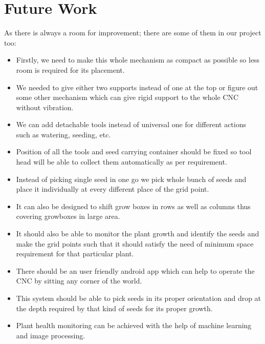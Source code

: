 \documentclass[a4paper,12pt,oneside]{book}
\begin{document}
\section{Future Work}
As there is always a room for improvement; there are some of them in our project too:
\begin{itemize}
    \item Firstly, we need to make this whole mechanism as compact as possible so less room is required for its placement.
    \item We needed to give either two supports instead of one at the top or figure out some other mechanism which can give rigid support to the whole CNC without vibration.
    \item We can add detachable tools instead of universal one for different actions such as watering, seeding, etc.
    \item Position of all the tools and seed carrying container should be fixed so tool head will be able to collect them automatically as per requirement.
    \item Instead of picking single seed in one go we pick whole bunch of seeds and place it individually at every different place of the grid point.
    \item It can also be designed to shift grow boxes in rows as well as columns thus covering growboxes in large area.
    \item It should also be able to monitor the plant growth and identify the seeds and make the grid points such that it should satisfy the need of minimum space requirement for that particular plant.
    \item There should be an user friendly android app which can help to operate the CNC by sitting any corner of the world.
    \item This system should be able to pick seeds in its proper orientation and drop at the depth required by that kind of seeds for its proper growth.
    \item Plant health monitoring can be achieved with the help of machine learning and image processing.
\end{itemize}
\end{document}
